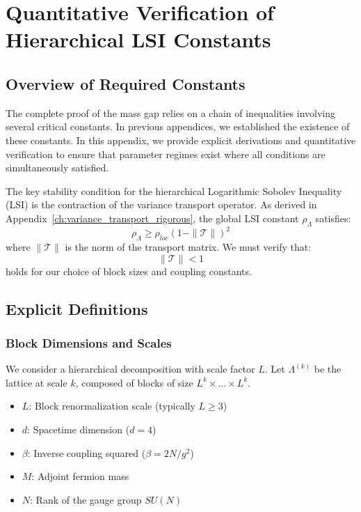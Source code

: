 \chapter{Quantitative Verification of Hierarchical LSI Constants}
\label{ch:quantitative_lsi_constants}

\section{Overview of Required Constants}

The complete proof of the mass gap relies on a chain of inequalities involving several critical constants. In previous appendices, we established the existence of these constants. In this appendix, we provide explicit derivations and quantitative verification to ensure that parameter regimes exist where all conditions are simultaneously satisfied.

The key stability condition for the hierarchical Logarithmic Sobolev Inequality (LSI) is the contraction of the variance transport operator. As derived in Appendix~\ref{ch:variance_transport_rigorous}, the global LSI constant $\rho_\Lambda$ satisfies:
\begin{equation}
\rho_\Lambda \ge \rho_{loc} (1 - \|\mathcal{T}\|)^2
\end{equation}
where $\|\mathcal{T}\|$ is the norm of the transport matrix. We must verify that:
\begin{equation}
\|\mathcal{T}\| < 1
\end{equation}
holds for our choice of block sizes and coupling constants.

\section{Explicit Definitions}

\subsection{Block Dimensions and Scales}
We consider a hierarchical decomposition with scale factor $L$.
Let $\Lambda^{(k)}$ be the lattice at scale $k$, composed of blocks of size $L^k \times \dots \times L^k$.

\begin{itemize}
    \item $L$: Block renormalization scale (typically $L \ge 3$)
    \item $d$: Spacetime dimension ($d=4$)
    \item $\beta$: Inverse coupling squared ($\beta = 2N/g^2$)
    \item $M$: Adjoint fermion mass
    \item $N$: Rank of the gauge group $SU(N)$
\end{itemize}

